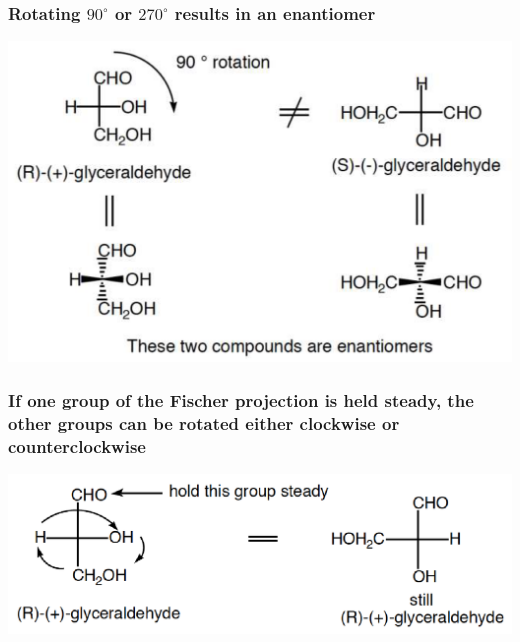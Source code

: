 \documentclass[11pt]{article}
\begin{document}
\subsubsection{Rotating \(90^{\circ}\) or \(270^{\circ}\) results in an enantiomer}
\label{sec:orgec80211}
\begin{center}
\includegraphics[width=.9\linewidth]{./images/90-rotation.png}
\end{center}
\subsubsection{If one group of the Fischer projection is held steady, the other groups can be rotated either clockwise or counterclockwise}
\label{sec:orgfb0e3e9}
\begin{center}
\includegraphics[width=.9\linewidth]{./images/three-group-rotation.png}
\end{center}
\end{document}
